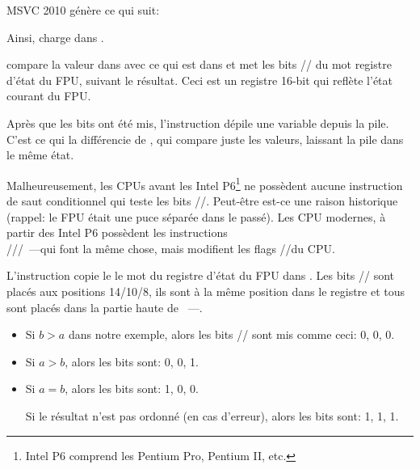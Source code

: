 
MSVC 2010 génère ce qui suit:




Ainsi, \FLD charge  dans .

\label{Czero_etc}
\newcommand{\Czero}{\GTT{C0}\xspace}
\newcommand{\Ctwo}{\GTT{C2}\xspace}
\newcommand{\Cthree}{\GTT{C3}\xspace}
\newcommand{\CThreeBits}{\Cthree/\Ctwo/\Czero}


\FCOMP compare la valeur dans  avec ce qui est dans  et met les bits
\CThreeBits du mot registre d'état du FPU, suivant le résultat.
Ceci est un registre 16-bit qui reflète l'état courant du FPU.

Après que les bits ont été mis, l'instruction \FCOMP dépile une variable depuis la
pile.
C'est ce qui la différencie de \FCOM, qui compare juste les valeurs, laissant la
pile dans le même état.

Malheureusement, les CPUs avant les Intel P6\footnote{Intel P6 comprend les Pentium
Pro, Pentium II, etc.} ne possèdent aucune instruction de saut conditionnel qui teste
les bits \CThreeBits.
Peut-être est-ce une raison historique (rappel: le FPU était une puce séparée dans
le passé). Les CPU modernes, à partir des Intel P6 possèdent les instructions \\
\FCOMI/\FCOMIP/\FUCOMI/\FUCOMIP~---qui
font la même chose, mais modifient les flags \ZF/\PF/\CF du CPU.


L'instruction \FNSTSW copie le le mot du registre d'état du FPU dans \AX.
Les bits \CThreeBits sont placés aux positions 14/10/8, ils sont à la même position
dans le registre \AX et tous sont placés dans la partie haute de \AX{}~---\AH{}.

\begin{itemize}
\item Si $b>a$ dans notre exemple, alors les bits \CThreeBits sont mis comme ceci: 0, 0, 0.
\item Si $a>b$, alors les bits sont: 0, 0, 1.
\item Si $a=b$, alors les bits sont: 1, 0, 0.

Si le résultat n'est pas ordonné (en cas d'erreur), alors les bits sont: 1, 1, 1.
\end{itemize}

